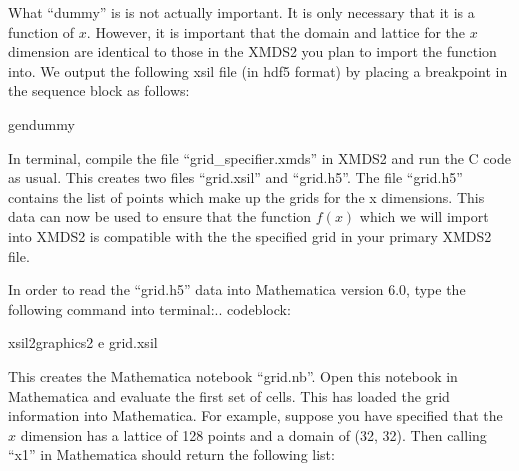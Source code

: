 \documentclass[letterpaper,10pt,english]{sphinxmanual}
\begin{document}
\sphinxAtStartPar
What “dummy” is is not actually important. It is only necessary that it is a function of \(x\). However, it is important that the domain and lattice for the \(x\) dimension are identical to those in the XMDS2 you plan to import the function into. We output the following xsil file (in hdf5 format) by placing a breakpoint in the sequence block as follows:

\begin{sphinxVerbatim}[commandchars=\\\{\}]
    
        gen\PYGZus{}dummy
\end{sphinxVerbatim}

\sphinxAtStartPar
In terminal, compile the file “grid\_specifier.xmds” in XMDS2 and run the C code as usual. This creates two files \sphinxhyphen{} “grid.xsil” and “grid.h5”. The file “grid.h5” contains the list of points which make up the grids for the x dimensions. This data can now be used to ensure that the function \(f(x)\) which we will import into XMDS2 is compatible with the the specified grid in your primary XMDS2 file.

\sphinxAtStartPar
In order to read the “grid.h5” data into Mathematica version 6.0, type the following command into terminal:.. code\sphinxhyphen{}block:

\begin{sphinxVerbatim}[commandchars=\\\{\}]
xsil2graphics2 \PYGZhy{}e grid.xsil
\end{sphinxVerbatim}

\sphinxAtStartPar
This creates the Mathematica notebook “grid.nb”. Open this notebook in Mathematica and evaluate the first set of cells. This has loaded the grid information into Mathematica. For example, suppose you have specified that the \(x\) dimension has a lattice of 128 points and a domain of (\sphinxhyphen{}32, 32). Then calling “x1” in Mathematica should return the following list:
\end{document}
